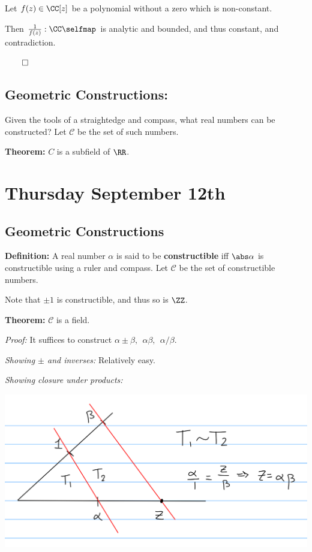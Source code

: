 Let \(f(z) \in \CC[z]\) be a polynomial without a zero which is
non-constant.

Then \(\frac 1 {f(z)}: \CC \selfmap\) is analytic and bounded, and thus
constant, and contradiction.

\(\qed\)

\hypertarget{geometric-constructions}{%
\subsection{Geometric Constructions:}\label{geometric-constructions}}

Given the tools of a straightedge and compass, what real numbers can be
constructed? Let \(\mathcal C\) be the set of such numbers.

\textbf{Theorem:} \(C\) is a subfield of \(\RR\).

\hypertarget{thursday-september-12th}{%
\section{Thursday September 12th}\label{thursday-september-12th}}

\hypertarget{geometric-constructions-1}{%
\subsection{Geometric Constructions}\label{geometric-constructions-1}}

\textbf{Definition:} A real number \(\alpha\) is said to be
\textbf{constructible} iff \(\abs \alpha\) is constructible using a
ruler and compass. Let \(\mathcal C\) be the set of constructible
numbers.

Note that \(\pm 1\) is constructible, and thus so is \(\ZZ\).

\textbf{Theorem:} \(\mathcal{C}\) is a field.

\emph{Proof:} It suffices to construct
\(\alpha \pm \beta,~~ \alpha\beta,~~ \alpha / \beta\).

\emph{Showing \(\pm\) and inverses:} Relatively easy.

\emph{Showing closure under products:}

\includegraphics{figures/2019-09-17-09:48.png}\\

